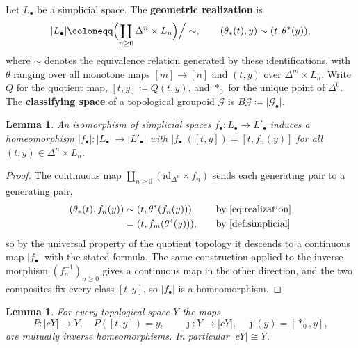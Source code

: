 \documentclass{extracta-temp-26}
\numberwithin{equation}{section}
\newtheorem{lem}[teo]{Lemma}
\theoremstyle{definition}
\theoremstyle{remark}
\newcommand{\G}{\mathcal{G}}
\newcommand{\id}{\mathrm{id}}
\newcommand{\real}[1]{\lvert #1\rvert}
\newcommand{\term}[1]{\textbf{#1}}
\begin{document}
Let \(L_\bullet\) be a simplicial space.
The \term{geometric realization} is
\begin{equation}\label{eq:realization}
\real{L_\bullet}\coloneqq\Bigl(\coprod_{n\ge 0}\Delta^n\times L_n\Bigr)\Big/\sim,
\qquad
(\theta_*(t),y)\sim(t,\theta^*(y)),
\end{equation}
where \(\sim\) denotes the equivalence relation generated by these identifications, with \(\theta\) ranging over all monotone maps \([m]\to[n]\) and \((t,y)\) over \(\Delta^m\times L_n\).
Write \(Q\) for the quotient map, \([t,y]\coloneqq Q(t,y)\), and \(\ast_0\) for the unique point of \(\Delta^0\).
The \term{classifying space} of a topological groupoid \(\G\) is \(B\G\coloneqq\real{\G_\bullet}\).

\begin{lem}\label{lem:realfunct}
An isomorphism of simplicial spaces \(f_\bullet\colon L_\bullet\to L'_\bullet\) induces a homeomorphism \(\real{f_\bullet}\colon\real{L_\bullet}\to\real{L'_\bullet}\) with \(\real{f_\bullet}([t,y])=[t,f_n(y)]\) for all \((t,y)\in\Delta^n\times L_n\).
\end{lem}

\begin{proof}
The continuous map \(\coprod_{n\ge 0}(\id_{\Delta^n}\times f_n)\) sends each generating pair to a generating pair,
\begin{equation}\label{eq:realfunct-pairs}
\begin{aligned}
(\theta_*(t),f_n(y))
&\sim(t,\theta^*(f_n(y)))&&\quad\text{by \eqref{eq:realization}}\\
&=(t,f_m(\theta^*(y))),&&\quad\text{by \cref{def:simplicial}}
\end{aligned}
\end{equation}
so by the universal property of the quotient topology it descends to a continuous map \(\real{f_\bullet}\) with the stated formula.
The same construction applied to the inverse morphism \((f_n^{-1})_{n\ge 0}\) gives a continuous map in the other direction, and the two composites fix every class \([t,y]\), so \(\real{f_\bullet}\) is a homeomorphism.
\end{proof}

\begin{lem}\label{lem:const}
For every topological space \(Y\) the maps
\begin{equation}\label{eq:const-maps}
P\colon\real{cY}\to Y,\quad P([t,y])=y,
\qquad
\jmath\colon Y\to\real{cY},\quad\jmath(y)=[\ast_0,y],
\end{equation}
are mutually inverse homeomorphisms.
In particular \(\real{cY}\cong Y\).
\end{lem}
\end{document}
